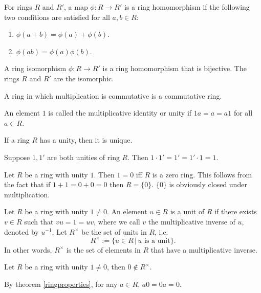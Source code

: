 \documentclass{article}
\begin{document}
\begin{defi}
	For rings \(R\) and \(R'\), a map \(\phi:R\rightarrow R'\) is a ring homomorphism if the following two conditions are satisfied for all \(a,b\in R\):
	\begin{enumerate}
		\item \(\phi(a+b)=\phi(a)+\phi(b)\).
		\item \(\phi(ab)=\phi(a)\phi(b)\).
	\end{enumerate}
\end{defi}
\begin{defi}
	A ring isomorphism \(\phi:R\rightarrow R'\) is a ring homomorphism that is bijective. The rings \(R\) and \(R'\) are the isomorphic.
\end{defi}
\begin{defi}
	A ring in which multiplication is commutative is a commutative ring.
\end{defi}
\begin{defi}[Unity]
	An element \(1\) is called the multiplicative identity or unity if \(1a=a=a1\) for all \(a\in R\).
\end{defi}
\begin{lem}
	If a ring \(R\) has a unity, then it is unique.
	\begin{IEEEproof}
		Suppose \(1,1'\) are both unities of ring \(R\). Then \(1\cdot1'=1'=1'\cdot 1=1\).
	\end{IEEEproof}
\end{lem}
\begin{rema}
	Let \(R\) be a ring with unity \(1\). Then \(1=0\) iff \(R\) is a zero ring. This follows from the fact that if \(1+1=0+0=0\) then \(R=\{0\}\). \(\{0\}\) is obviously closed under multiplication.
\end{rema}
\begin{defi}[Unit]
	Let \(R\) be a ring with unity \(1\neq 0\). An element \(u\in R\) is a unit of \(R\) if there exists \(v\in R\) such that \(vu=1=uv\), where we call \(v\) the multiplicative inverse of \(u\), denoted by \(u^{-1}\). Let \(R^\times\) be the set of units in \(R\), i.e.
	\begin{equation*}
		R^\times:=\{u\in R\,|\,u\text{ is a unit}\}.
	\end{equation*}
	In other words, \(R^\times\) is the set of elements in \(R\) that have a multiplicative inverse.
\end{defi}
\begin{rema}
	Let \(R\) be a ring with unity \(1\neq 0\), then \(0\notin R^\times\).
	\begin{IEEEproof}
		By theorem \ref{ringproperties}, for any \(a\in R\), \(a0=0a=0\).
	\end{IEEEproof}
\end{rema}
\end{document}
